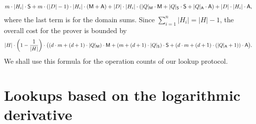 \documentclass[11pt]{article}
\theoremstyle{definition}
\theoremstyle{remark}
\begin{document}
\begin{align*}
m\cdot |H_i|\cdot \textsf S + m \cdot (|D| - 1)\cdot |H_{i}| \cdot (\textsf M + \textsf A)
+  |D|\cdot |H_{i}| \cdot ( |Q|_\textsf M \cdot \textsf{M} +   |Q|_\textsf S \cdot \textsf S + |Q|_\textsf A \cdot \textsf A) 
+ |D|\cdot |H_{i}| \cdot \textsf A,
\end{align*}
where the last term is for the domain sums.
Since $\sum_{i=1}^{n} |H_{i}| = |H| - 1$, the overall cost for the prover is bounded by 
\begin{equation}
\label{e:sumcheck:cost:precise}
|H|\cdot \left(1-\frac{1}{|H|}\right)\cdot \big( (d\cdot m + (d+1)\cdot |Q|_\textsf M)\cdot\textsf M +
 (m + (d + 1)\cdot |Q|_\textsf S) \cdot\textsf S +
(d\cdot m + (d+1)\cdot (|Q|_\textsf A + 1))\cdot\textsf A
\big).
\end{equation}
We shall use this formula for the operation counts of our lookup protocol.






\section{Lookups based on the logarithmic derivative}
\label{s:lookups}
\end{document}
